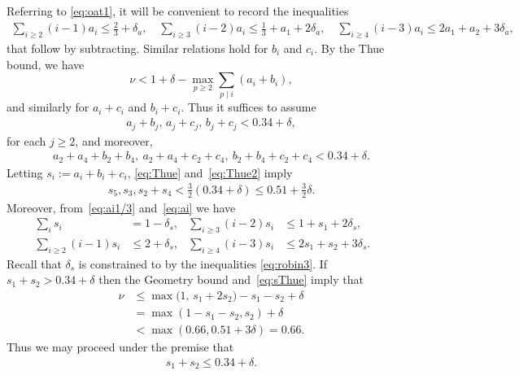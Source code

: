 Referring to \eqref{eq:oat1}, it  will be convenient to record the inequalities
\begin{align}\label{eq:ai}
\sum_{i\ge2} (i-1)a_i \le \frac{2}{3}+\delta_a, \quad \sum_{i\ge3} (i-2)a_i\le\frac{1}{3}+a_1 + 2\delta_a, \quad
\sum_{i\ge4}(i-3)a_i \le 2a_1+a_2+3\delta_a,
\end{align}
that follow by subtracting. Similar relations hold for $b_i$ and $c_i$.
By the Thue bound, we have
$$
\nu < 1 +\delta- \max_{p\ge2}\sum_{p\mid i} (a_i+b_i),
$$
and similarly for $a_i+c_i$ and $b_i+c_i$. Thus it suffices to assume
\begin{align}\label{eq:Thue}
a_j+b_j, \,a_j+c_j,\, b_j+c_j < 0.34+\delta,
\end{align}
for each $j\geq 2$, and moreover,
\begin{align}\label{eq:Thue2}
a_2+a_4+b_2+b_4, \ a_2+a_4+c_2+c_4, \
b_2+b_4+c_2+c_4 <  0.34+\delta.
\end{align}
Letting $s_i :=a_i+b_i+c_i$, \eqref{eq:Thue} and~\eqref{eq:Thue2} imply
\begin{align}\label{eq:sThue}
s_5,s_3,s_2+s_4 < \frac{3}{2}(0.34+\delta)\le 0.51+\frac{3}{2}\delta.
\end{align}
Moreover, from~\eqref{eq:ai1/3} and~\eqref{eq:ai} we  have
\begin{align*}
\sum_i s_i &= 1-\delta_s, &
\sum_{i\ge 3}(i-2)s_i & \le 1 + s_1 + 2\delta_s, \\
\sum_{i\ge2} (i-1)s_i&\le  2 + \delta_s, &  \sum_{i\ge4}(i-3)s_i & \le 2s_1+s_2 + 3\delta_s.& & \end{align*}
Recall that $\delta_s$ is constrained to by the inequalities \eqref{eq:robin3}.
If $s_1+s_2> 0.34+\delta$ then the Geometry bound and~\eqref{eq:sThue} imply that
\begin{align*}
\nu & \le \max\big(1,\, s_1+2s_2\big) -s_1-s_2 + \delta
\\
&  = \max(1-s_1-s_2, s_2) +\delta\\
&< \max\left(0.66, 0.51+3\delta\right) = 0.66.
\end{align*}
Thus we may proceed under the premise that
\begin{align}\label{eq:s_1+s_2<0.34}
s_1+s_2\leq 0.34 +\delta.
\end{align}


